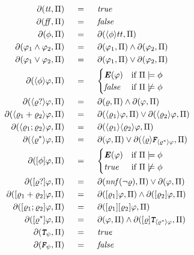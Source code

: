 \begin{align}
\begin{aligned}
\Dfun{\ttrue} 			\ind &= \ind \true\\
\Dfun{\ffalse} 			\ind &= \ind \false\\
\Dfun{\PropFormula}   	\ind &= \ind \Dfun{\DIAM{\PropFormula}tt}\\
\Dfun{\varphi_1 \lAND \varphi_2} 			\ind &= \ind   \Dfun{\varphi_1} \lAND \Dfun{\varphi_2}\\
\Dfun{\varphi_1 \lOR  \varphi_2} 			\ind &= \ind   \Dfun{\varphi_1} \lOR \Dfun{\varphi_2}\\
\Dfun{\DIAM{\PropFormula}\varphi}             \ind &= \ind 
	\begin{cases}
		\textbf{\textit{E}}(\varphi) 	& \text{if}\ \PropInt \models \PropFormula\\
		\false     						& \text{if}\ \PropInt \not\models \PropFormula\\
	\end{cases}\\
\Dfun{\DIAM{\regexp?}\varphi}             			\ind &= \ind \Dfun{\regexp} \lAND \Dfun{\varphi}\\
\Dfun{\DIAM{\regexp_1 + \regexp_2}\varphi}             \ind &= \ind \Dfun{\DIAM{\regexp_1}\varphi} \lOR \Dfun{\DIAM{\regexp_2}\varphi}\\
\Dfun{\DIAM{\regexp_1 ; \regexp_2}\varphi}             \ind &= \ind \Dfun{\DIAM{\regexp_1}\DIAM{\regexp_2}\varphi}\\
\Dfun{\DIAM{\regexp^*}\varphi}             			\ind &= \ind \Dfun{\varphi} \lOR \Dfun{\DIAM{\regexp}\FalseDelta{\DIAM{\regexp^*}\varphi}}\\
\Dfun{\BOX{\PropFormula}\varphi}             \ind &= \ind 
	\begin{cases}
		\textbf{\textit{E}}(\varphi) 	& \text{if}\ \PropInt \models \PropFormula\\
		\true     						& \text{if}\ \PropInt \not\models \PropFormula\\
	\end{cases}\\
\Dfun{\BOX{\regexp?}\varphi}             			\ind &= \ind \Dfun{\nnf(\lnot \regexp)} \lOR \Dfun{\varphi}\\
\Dfun{\BOX{\regexp_1 + \regexp_2}\varphi}             \ind &= \ind \Dfun{\BOX{\regexp_1}\varphi} \lAND \Dfun{\BOX{\regexp_2}\varphi}\\
\Dfun{\BOX{\regexp_1 ; \regexp_2}\varphi}             \ind &= \ind \Dfun{\BOX{\regexp_1}\BOX{\regexp_2}\varphi}\\
\Dfun{\BOX{\regexp^*}\varphi}             			\ind &= \ind \Dfun{\varphi} \lAND \Dfun{\BOX{\regexp}\TrueDelta{\DIAM{\regexp^*}\varphi}}\\
\Dfun{\TrueDelta{\psi}} 			\ind &= \ind \true\\
\Dfun{\FalseDelta{\psi}} 			\ind &= \ind \false \label{delta-ldlf}
\end{aligned}					
\end{align}
